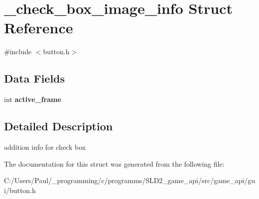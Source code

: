 \hypertarget{struct__check__box__image__info}{\section{\+\_\+check\+\_\+box\+\_\+image\+\_\+info Struct Reference}
\label{struct__check__box__image__info}
}


{\ttfamily \#include $<$button.\+h$>$}

\subsection*{Data Fields}
\begin{DoxyCompactItemize}
\item 
\hypertarget{struct__check__box__image__info_ab9f5f69e3cdf7b73b9e13348e0755ff3}{int {\bfseries active\+\_\+frame}}\label{struct__check__box__image__info_ab9f5f69e3cdf7b73b9e13348e0755ff3}

\end{DoxyCompactItemize}


\subsection{Detailed Description}
addition info for check box 

The documentation for this struct was generated from the following file\+:\begin{DoxyCompactItemize}
\item 
C\+:/\+Users/\+Paul/\+\_\+programming/c/programms/\+S\+L\+D2\+\_\+game\+\_\+api/src/game\+\_\+api/gui/button.\+h\end{DoxyCompactItemize}
